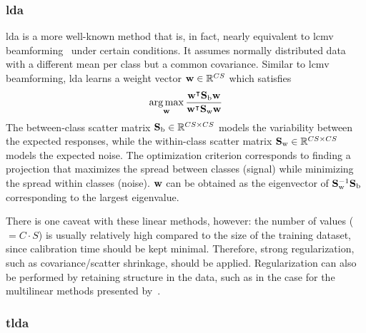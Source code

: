 \subsubsection{\Acf{lda}}

\Ac{lda} is a more well-known method that is, in fact, nearly equivalent to
\ac{lcmv} beamforming~\cite{Treder2016} under certain conditions.
It assumes normally distributed data with a different mean per class but a common
covariance.
Similar to \ac{lcmv} beamforming, \ac{lda} learns a weight vector
$\mathbf{w}\in\mathbb{R}^{CS}$ which satisfies
\begin{equation}
  \operatorname*{arg\,max}_{\mathbf{w}}\frac{\mathbf{w}^\intercal\mathbf{S}_\text{b}\mathbf{w}}{\mathbf{w}^\intercal\mathbf{S}_\text{w}\mathbf{w}}
\end{equation}
The between-class scatter matrix $\mathbf{S}_\text{b}\in\mathbb{R}^{CS\times CS}$ models the variability between the
expected responses, while the within-class scatter matrix $\mathbf{S}_\text{w}\in\mathbb{R}^{CS\times CS}$ models the
expected noise.
The optimization criterion corresponds to finding a projection that maximizes the spread
between classes (signal) while minimizing the spread within classes (noise).
$\mathbf{w}$ can be obtained as the eigenvector of
$\mathbf{S}_\text{w}^{-1}\mathbf{S}_\text{b}$ corresponding to the largest eigenvalue.

There is one caveat with these linear methods, however:
the number of values ($=C\cdot S$) is usually relatively high compared to the
size of the training dataset, since calibration time should be kept minimal.
Therefore, strong regularization, such as covariance/scatter
shrinkage, should be applied.
Regularization can also be performed by retaining structure in the data, such as in the
case for the multilinear methods presented by~\textcite{Lotte2018}.

\subsubsection{\Acf{tlda}}

